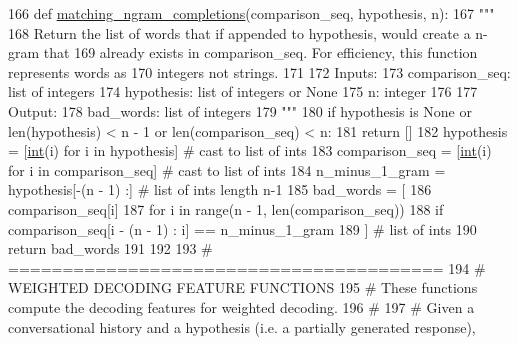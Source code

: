 \begin{DoxyCode}
166 \textcolor{keyword}{def }\hyperlink{namespaceprojects_1_1controllable__dialogue_1_1controllable__seq2seq_1_1controls_ab562827e4a16578079aa8121ebadcda7}{matching\_ngram\_completions}(comparison\_seq, hypothesis, n):
167     \textcolor{stringliteral}{"""}
168 \textcolor{stringliteral}{    Return the list of words that if appended to hypothesis, would create a n-gram that}
169 \textcolor{stringliteral}{    already exists in comparison\_seq. For efficiency, this function represents words as}
170 \textcolor{stringliteral}{    integers not strings.}
171 \textcolor{stringliteral}{}
172 \textcolor{stringliteral}{    Inputs:}
173 \textcolor{stringliteral}{        comparison\_seq: list of integers}
174 \textcolor{stringliteral}{        hypothesis: list of integers or None}
175 \textcolor{stringliteral}{        n: integer}
176 \textcolor{stringliteral}{}
177 \textcolor{stringliteral}{    Output:}
178 \textcolor{stringliteral}{        bad\_words: list of integers}
179 \textcolor{stringliteral}{    """}
180     \textcolor{keywordflow}{if} hypothesis \textcolor{keywordflow}{is} \textcolor{keywordtype}{None} \textcolor{keywordflow}{or} len(hypothesis) < n - 1 \textcolor{keywordflow}{or} len(comparison\_seq) < n:
181         \textcolor{keywordflow}{return} []
182     hypothesis = [\hyperlink{namespacelanguage__model_1_1eval__ppl_a7d12ee00479673c5c8d1f6d01faa272a}{int}(i) \textcolor{keywordflow}{for} i \textcolor{keywordflow}{in} hypothesis]  \textcolor{comment}{# cast to list of ints}
183     comparison\_seq = [\hyperlink{namespacelanguage__model_1_1eval__ppl_a7d12ee00479673c5c8d1f6d01faa272a}{int}(i) \textcolor{keywordflow}{for} i \textcolor{keywordflow}{in} comparison\_seq]  \textcolor{comment}{# cast to list of ints}
184     n\_minus\_1\_gram = hypothesis[-(n - 1) :]  \textcolor{comment}{# list of ints length n-1}
185     bad\_words = [
186         comparison\_seq[i]
187         \textcolor{keywordflow}{for} i \textcolor{keywordflow}{in} range(n - 1, len(comparison\_seq))
188         \textcolor{keywordflow}{if} comparison\_seq[i - (n - 1) : i] == n\_minus\_1\_gram
189     ]  \textcolor{comment}{# list of ints}
190     \textcolor{keywordflow}{return} bad\_words
191 
192 
193 \textcolor{comment}{# ========================================}
194 \textcolor{comment}{# WEIGHTED DECODING FEATURE FUNCTIONS}
195 \textcolor{comment}{# These functions compute the decoding features for weighted decoding.}
196 \textcolor{comment}{#}
197 \textcolor{comment}{# Given a conversational history and a hypothesis (i.e. a partially generated response),}

\end{DoxyCode}
